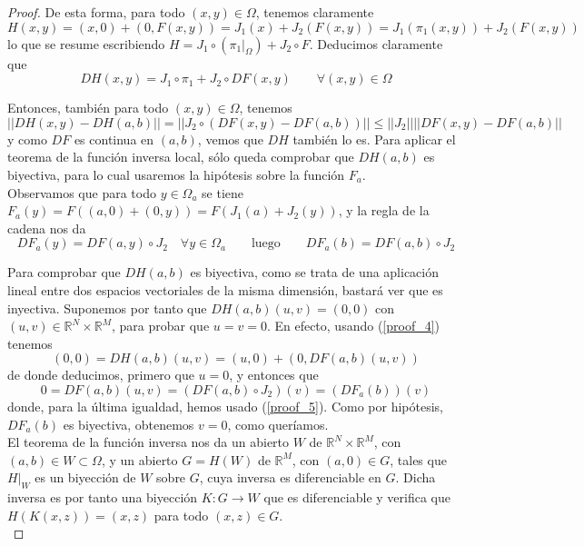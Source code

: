 \documentclass[a4paper, 12pt]{article}
\begin{document}
\begin{enumerate}[label=\textbf{\arabic*}.]
\begin{proof}
De esta forma, para todo \((x,y) \in \Omega\), tenemos claramente
\[
	H(x,y) = (x,0) + (0, F(x,y)) = J_1 (x) + J_2 (F(x,y)) = J_1 (\pi_1(x,y)) + J_2 (F(x,y))
\]
lo que se resume escribiendo \(H = J_1 \circ (\pi_1 |_{\Omega}) + J_2 \circ F\). Deducimos claramente que
\begin{equation}\label{proof_4}
	DH (x,y) = J_1 \circ \pi_1 + J_2 \circ DF(x,y) \qquad \forall (x,y) \in \Omega
\end{equation}

Entonces, también para todo \((x,y) \in \Omega\), tenemos
\[
	||DH(x,y) - DH(a,b)|| = || J_2 \circ (DF(x,y) - DF(a,b))|| \leq ||J_2|| || DF (x,y) - DF(a,b)||
\]
y como \(DF\) es continua en \((a,b)\), vemos que \(DH\) también lo es. Para aplicar el teorema de la función inversa local, sólo queda comprobar que \(DH(a,b)\) es biyectiva, para lo cual usaremos la hipótesis sobre la función \(F_a\). \\

Observamos que para todo \(y \in \Omega_a\) se tiene \(F_a (y) = F((a,0) + (0,y)) = F(J_1 (a) + J_2(y))\), y la regla de la cadena nos da
\begin{equation}\label{proof_5}
	DF_a(y) = DF(a,y) \circ J_2 \quad \forall y \in \Omega_a \qquad \text{luego} \qquad DF_a(b) = DF(a,b) \circ J_2
\end{equation}

Para comprobar que \(DH(a,b)\) es biyectiva, como se trata de una aplicación lineal entre dos espacios vectoriales de la misma dimensión, bastará ver que es inyectiva. Suponemos por tanto que \(DH (a,b) (u,v) = (0,0)\) con \((u,v) \in \mathbb{R}^N \times \mathbb{R}^M\), para probar que \(u = v = 0\). En efecto, usando (\ref{proof_4}) tenemos
\[
	(0,0) = DH(a,b)(u,v) = (u,0) + (0, DF(a,b)(u,v))
\]
de donde deducimos, primero que \(u = 0\), y entonces que
\[
	0 = DF (a,b)(u,v) = (DF(a,b) \circ J_2) (v) = (DF_a(b))(v)
\]
donde, para la última igualdad, hemos usado (\ref{proof_5}). Como por hipótesis, \(DF_a(b)\) es biyectiva, obtenemos \(v = 0\), como queríamos. \\

El teorema de la función inversa nos da un abierto \(W \) de \(\mathbb{R}^N \times \mathbb{R}^M\), con \((a,b) \in W \subset \Omega\), y un abierto \(G = H(W)\) de \(\mathbb{R}^M\), con \((a,0) \in G\), tales que \(H |_W\) es un biyección de \(W\) sobre \(G\), cuya inversa es diferenciable en \(G\). Dicha inversa es por tanto una biyección \(K: G \to W\) que es diferenciable y verifica que \(H(K(x,z)) = (x,z)\) para todo \((x,z) \in G\). \\


\end{proof}
\end{enumerate}
\end{document}
